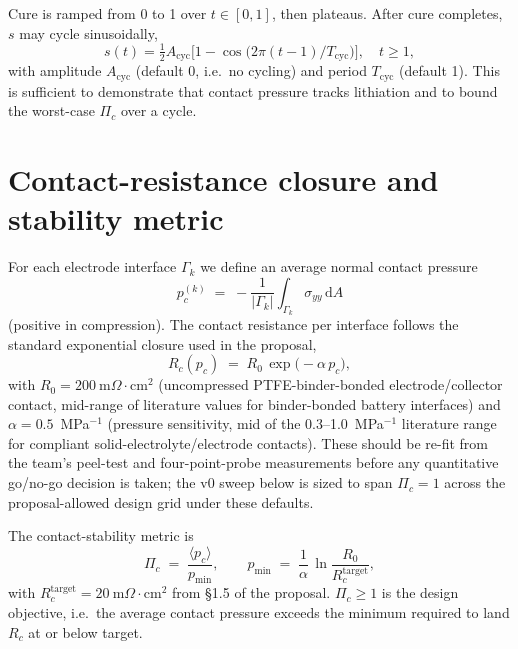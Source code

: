 \documentclass[11pt,letterpaper]{article}
\begin{document}
Cure is ramped from 0 to 1 over $t \in [0, 1]$, then plateaus.  After
cure completes, $s$ may cycle sinusoidally,
\begin{equation}
s(t) = \tfrac{1}{2}A_{\text{cyc}} \bigl[1 - \cos\!\bigl(2\pi(t-1)/T_{\text{cyc}}\bigr)\bigr],
\quad t \ge 1,
\end{equation}
with amplitude $A_{\text{cyc}}$ (default 0, i.e.\ no cycling) and period
$T_{\text{cyc}}$ (default 1).  This is sufficient to demonstrate that
contact pressure tracks lithiation and to bound the worst-case
$\Pi_c$ over a cycle.

\section{Contact-resistance closure and stability metric}

For each electrode interface $\Gamma_k$ we define an average normal
contact pressure
\begin{equation}
p_c^{(k)} \;=\; - \frac{1}{|\Gamma_k|} \int_{\Gamma_k} \sigma_{yy} \,\mathrm{d}A
\end{equation}
(positive in compression).  The contact resistance per interface follows
the standard exponential closure used in the proposal,
\begin{equation}
R_c(p_c) \;=\; R_0 \, \exp\!\bigl(-\alpha\, p_c\bigr),
\label{eq:Rc}
\end{equation}
with $R_0 = 200~$m$\Omega\cdot$cm$^2$ (uncompressed PTFE-binder-bonded
electrode/collector contact, mid-range of literature values for
binder-bonded battery interfaces) and $\alpha = 0.5$~MPa$^{-1}$
(pressure sensitivity, mid of the 0.3--1.0~MPa$^{-1}$ literature range
for compliant solid-electrolyte/electrode contacts).  These should be
re-fit from the team's peel-test and four-point-probe measurements
before any quantitative go/no-go decision is taken; the v0 sweep below
is sized to span $\Pi_c = 1$ across the proposal-allowed design grid
under these defaults.

The contact-stability metric is
\begin{equation}
\Pi_c \;=\; \frac{\langle p_c \rangle}{p_{\text{min}}},
\qquad p_{\text{min}} \;=\; \frac{1}{\alpha}\,\ln\!\frac{R_0}{R_c^{\text{target}}},
\label{eq:Pic}
\end{equation}
with $R_c^{\text{target}} = 20~$m$\Omega\cdot$cm$^2$ from
\S1.5 of the proposal.  $\Pi_c \ge 1$ is the design objective, i.e.\ the
average contact pressure exceeds the minimum required to land $R_c$ at
or below target.
\end{document}
